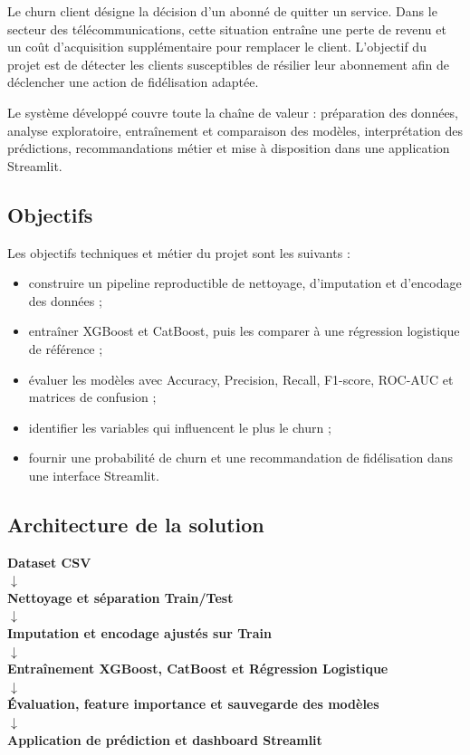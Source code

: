 \documentclass[12pt, a4paper]{article}
\begin{document}
Le churn client désigne la décision d'un abonné de quitter un service. Dans le
secteur des télécommunications, cette situation entraîne une perte de revenu et
un coût d'acquisition supplémentaire pour remplacer le client. L'objectif du
projet est de détecter les clients susceptibles de résilier leur abonnement afin
de déclencher une action de fidélisation adaptée.

\begin{infobox}
Le système développé couvre toute la chaîne de valeur : préparation des données,
analyse exploratoire, entraînement et comparaison des modèles, interprétation
des prédictions, recommandations métier et mise à disposition dans une
application Streamlit.
\end{infobox}

\subsection{Objectifs}

Les objectifs techniques et métier du projet sont les suivants :
\begin{itemize}[leftmargin=*]
    \item construire un pipeline reproductible de nettoyage, d'imputation et
    d'encodage des données ;
    \item entraîner XGBoost et CatBoost, puis les comparer à une régression
    logistique de référence ;
    \item évaluer les modèles avec Accuracy, Precision, Recall, F1-score,
    ROC-AUC et matrices de confusion ;
    \item identifier les variables qui influencent le plus le churn ;
    \item fournir une probabilité de churn et une recommandation de
    fidélisation dans une interface Streamlit.
\end{itemize}

\subsection{Architecture de la solution}

\begin{center}
\begin{tcolorbox}[colback=mlblue!3,colframe=mlblue,width=0.92\textwidth]
\centering
\textbf{Dataset CSV}\\
$\downarrow$\\
\textbf{Nettoyage et séparation Train/Test}\\
$\downarrow$\\
\textbf{Imputation et encodage ajustés sur Train}\\
$\downarrow$\\
\textbf{Entraînement XGBoost, CatBoost et Régression Logistique}\\
$\downarrow$\\
\textbf{Évaluation, feature importance et sauvegarde des modèles}\\
$\downarrow$\\
\textbf{Application de prédiction et dashboard Streamlit}
\end{tcolorbox}
\end{center}
\end{document}
